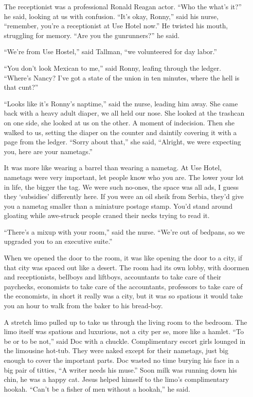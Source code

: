 \documentclass[oneside]{book}
\begin{document}
The receptionist was a professional Ronald Reagan actor.  ``Who the what's it?'' he said, looking at us
with confusion.  ``It's okay, Ronny,'' said his nurse, ``remember, you're a receptionist at Use Hotel now.''
He twisted his mouth, struggling for memory.  ``Are you the gunrunners?'' he said.

``We're from Use Hostel,'' said Tallman, ``we volunteered for day labor.''

``You don't look Mexican to me,'' said Ronny, leafing through the ledger.  ``Where's Nancy?
I've got a state of the union in ten minutes, where the hell is that cunt?''

``Looks like it's Ronny's naptime,'' said the nurse, leading him away.
She came back with a heavy adult diaper, we all held our nose.  She looked at the trashcan on
one side, she looked at us on the other.  A moment of indecision.  Then she walked to us,
setting the diaper on the counter and daintily covering it with a page from the ledger.
``Sorry about that,'' she said, ``Alright, we were expecting you, here are your nametags.''

It was more like wearing a barrel than wearing a nametag.
At Use Hotel, nametags were very important, let people know who you are.  The lower your lot in life,
the bigger the tag.  We were such no-ones, the space was all
ads, I guess they `subsidies' differently here.  If you were
an oil sheik from Serbia, they'd give you a nametag smaller than a miniature postage stamp.
You'd stand around gloating while awe-struck people craned their necks trying
to read it.

``There's a mixup with your room,'' said the nurse.  ``We're out of bedpans, so we upgraded
you to an executive suite.''

When we opened the door to the room, it was like opening the door to a city, if that city was spaced out like a desert.
The room had its own lobby, with doormen and receptionists, bellboys and liftboys,
accountants to take care of their paychecks, economists to take care of the accountants, professors to
take care of the economists, in short it really was a city, but it was so spatious it would take you an hour to
walk from the baker to his bread-boy.

A stretch limo pulled up to take us through the living room to the bedroom.
The limo itself was spatious and luxurious, not a city per se, more like a hamlet.
``To be or to be not,'' said Doc with a chuckle.
Complimentary escort girls lounged in the limousine hot-tub.  They were naked except for their nametags,
just big enough to cover the important parts.  Doc wasted no time burying his face in a big pair
of titties, ``A writer needs his muse.''  Soon milk was running down his chin, he was a happy cat.
Jesus helped himself to the limo's complimentary hookah.  ``Can't be a fisher of men without a hookah,''
he said.
\end{document}
